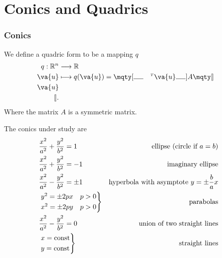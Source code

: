 \documentclass[a4paper,12pt]{article}
\begin{document}
\part{Conics and Quadrics}

\section{Conics}
We define a quadric form to be a mapping $q$
\begin{align*}
	q: \mathbb{R}^n & \longrightarrow \mathbb{R}                                                                                  \\
	\va{u}          & \longmapsto q(\va{u}) = \mqty[\rule{5mm}{0.4pt} & ^{\mathsmaller T}\va{u} & \rule{5mm}{0.4pt}]A\mqty[\vline \\\va{u}\\\vline]
	.\end{align*}
Where the matrix $A$ is a symmetric matrix.

The conics under study are
\begin{align*}
	 & \frac{x^2}{a^2}+\frac{y^2}{b^2}=1 \quad & \text{ellipse (circle if \(a=b\))}                \\
	 & \frac{x^2}{a^2}+\frac{y^2}{b^2}=-1      & \text{imaginary ellipse}                          \\
	 & \frac{x^2}{a^2}-\frac{y^2}{b^2}=\pm1    & \text{hyperbola with asymptote }y=\pm\frac{b}{a}x \\
	 & \begin{rcases}
		y^2=\pm 2px \quad p>0\\
		x^2=\pm 2py \quad p>0
	\end{rcases}               & \text{parabolas}                                  \\
	 & \frac{x^2}{a^2}-\frac{y^2}{b^2}=0       & \text{union of two straight lines}                \\
	 & \begin{rcases}
		x=\text{const}\\
		y=\text{const}
	\end{rcases}              & \text{straight lines}
\end{align*}
\end{document}
